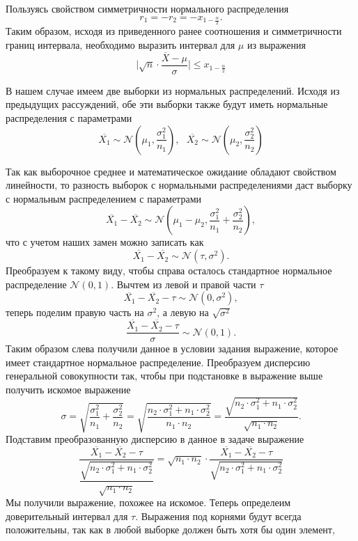 \documentclass[a4paper, 12pt]{article}
\begin{document}
    \noindent Пользуясь свойством симметричности нормального распределения
    $$r_1=-r_2=-x_{1-\frac{\alpha}{2}}.$$
    Таким образом, исходя из приведенного ранее соотношения и симметричности границ интервала, необходимо выразить интервал для $\mu$ из выражения 
    $$\Bigg|\sqrt{n}\cdot\dfrac{\overline{X}-\mu}{\sigma}\Bigg|\leq x_{1-\frac{\alpha}{2}}$$


    В нашем случае имеем две выборки из нормальных распределений. Исходя из предыдущих рассуждений, обе эти выборки
    также будут иметь нормальные распределения с параметрами
    $$\overline{X_1}\sim\mathcal{N}\left(\mu_1,\dfrac{\sigma_1^2}{n_1}\right),\,\,\,\,\overline{X_2}\sim\mathcal{N}\left(\mu_2,\dfrac{\sigma_2^2}{n_2}\right)$$


    Так как выборочное среднее и математическое ожидание обладают свойством линейности, то разность выборок с нормальными распределениями
    даст выборку с нормальным распределением с параметрами
    $$\overline{X_1}-\overline{X_2}\sim\mathcal{N}\left(\mu_1-\mu_2,\dfrac{\sigma_1^2}{n_1}+\dfrac{\sigma_2^2}{n_2}\right),$$
    что с учетом наших замен можно записать как $$\overline{X_1}-\overline{X_2}\sim\mathcal{N}\left(\tau,\sigma^2\right).$$
    Преобразуем к такому виду, чтобы справа осталось стандартное нормальное распределение $\mathcal{N}\left(0,1\right).$
    Вычтем из левой и правой части $\tau$
    $$\overline{X_1}-\overline{X_2}-\tau\sim\mathcal{N}\left(0,\sigma^2\right),$$
    теперь поделим правую часть на $\sigma^2$, а левую на $\sqrt{\sigma^2}$
    $$\dfrac{\overline{X_1}-\overline{X_2}-\tau}{\sigma}\sim\mathcal{N}\left(0,1\right).$$
    Таким образом слева получили данное в условии задания выражение, которое имеет стандартное нормальное распределение.
    Преобразуем дисперсию генеральной совокупности так, чтобы при подстановке в выражение выше получить искомое выражение
    $$\sigma=\sqrt{\dfrac{\sigma_1^2}{n_1}+\dfrac{\sigma_2^2}{n_2}}=\sqrt{\dfrac{n_2\cdot\sigma_1^2+n_1\cdot\sigma_2^2}{n_1\cdot n_2}}=\dfrac{\sqrt{n_2\cdot\sigma_1^2+n_1\cdot\sigma_2^2}}{\sqrt{n_1\cdot n_2}}.$$
    Подставим преобразованную дисперсию в данное в задаче выражение
    $$\dfrac{\overline{X_1}-\overline{X_2}-\tau}{\dfrac{\sqrt{n_2\cdot\sigma_1^2+n_1\cdot\sigma_2^2}}{\sqrt{n_1\cdot n_2}}}=\sqrt{n_1\cdot n_2}\cdot\dfrac{\overline{X_1}-\overline{X_2}-\tau}{\sqrt{n_2\cdot\sigma_1^2+n_1\cdot\sigma_2^2}}$$
    Мы получили выражение, похожее на искомое. Теперь определеим доверительный интервал для $\tau$. Выражения под корнями будут всегда положительны, так как в любой выборке должен быть хотя бы один элемент,
\end{document}
